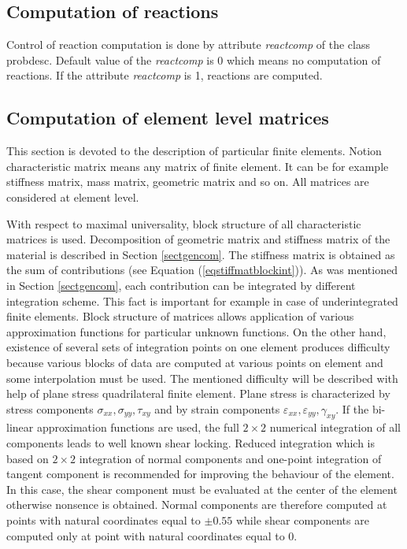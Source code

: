 \subsection{Computation of reactions}
\label{sectreactcomp}

Control of reaction computation is done by attribute {\it reactcomp} of the class {\sf probdesc}.
Default value of the {\it reactcomp} is 0 which means no computation of reactions. If the attribute
{\it reactcomp} is 1, reactions are computed.

\subsection{Computation of element level matrices}
This section is devoted to the description of particular finite elements. Notion characteristic
matrix  means any matrix of finite element. It can be for example
stiffness matrix, mass matrix, geometric matrix and so on. All matrices are considered at element level.

With respect to maximal universality, block structure of all characteristic matrices is used.
Decomposition of geometric matrix and stiffness matrix of the material is described in Section \ref{sectgencom}.
The stiffness matrix is obtained as the sum of contributions (see Equation (\ref{eqstiffmatblockint})).
As was mentioned in Section \ref{sectgencom}, each contribution can be integrated by different integration
scheme. This fact is important for example in case of underintegrated finite elements. Block structure of
matrices allows application of various approximation functions for particular unknown functions.
On the other hand, existence of several sets of integration points on one element produces difficulty because
various blocks of data are computed at various points on element and some interpolation must be used. The
mentioned difficulty will be described with help of plane stress quadrilateral finite element. Plane stress
is characterized by stress components $\sigma_{xx}, \sigma_{yy}, \tau_{xy}$ and by strain components
$\varepsilon_{xx}, \varepsilon_{yy}, \gamma_{xy}$. If the bi-linear approximation functions are used, the full
$2 \times 2$ numerical integration of all components leads to well known shear locking. Reduced integration
which is based on $2 \times 2$ integration of normal components and one-point integration of tangent component
is recommended for improving the behaviour of the element. In this case, the shear component must be evaluated
at the center of the element otherwise nonsence is obtained. Normal components are therefore computed at points
with natural coordinates equal to $\pm0.55$ while shear components are computed only at point with natural
coordinates equal to $0$.

